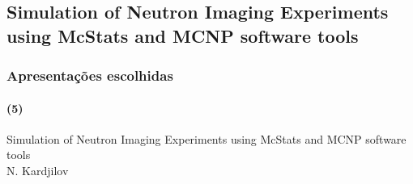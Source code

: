 \documentclass[svgnames,smaller,table]{beamer}
\begin{document}
\begin{frame}
  
\end{frame}
\begin{frame}
  
\end{frame}
\begin{frame}
  
\end{frame}
\begin{frame}
  
\end{frame}
\begin{frame}
  
\end{frame}
\begin{frame}
  
\end{frame}
\begin{frame}
  
\end{frame}
\begin{frame}
  
\end{frame}
\begin{frame}
  
\end{frame}
\begin{frame}
  
\end{frame}
\begin{frame}
  
\end{frame}
\begin{frame}
  
\end{frame}
\begin{frame}
  
\end{frame}
\begin{frame}
  
\end{frame}

\subsection{Simulation of Neutron Imaging Experiments using McStats and MCNP software tools}
\begin{frame}
  \frametitle{Apresentações escolhidas}
  \framesubtitle{(5)}
  \begin{center}
    Simulation of Neutron Imaging Experiments using McStats and MCNP software tools\\
    \vspace{2.0cm}
    N. Kardjilov
  \end{center}
\end{frame}
\end{document}
